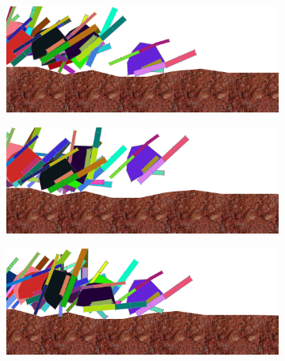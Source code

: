           \begin{figure}[H]
            \centering
            \begin{subfigure}[b]{0.45\textwidth}
              \includegraphics[width=\linewidth,center]{graphics/simulation-results/4_gen3000_1}
              \caption{\label{fig:gen3000_1}}
            \end{subfigure}
            \begin{subfigure}[b]{0.45\textwidth}
              \includegraphics[width=\linewidth,center]{graphics/simulation-results/4_gen3000_2}
              \caption{\label{fig:gen3000_2}}
            \end{subfigure}
            \begin{subfigure}[b]{0.45\textwidth}
              \includegraphics[width=\linewidth,center]{graphics/simulation-results/4_gen3000_3}
              \caption{\label{fig:gen3000_3}}
            \end{subfigure}
            \begin{subfigure}[b]{0.45\textwidth}

\end{subfigure}
\end{figure}
